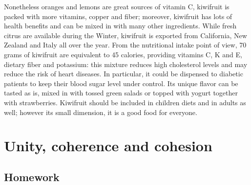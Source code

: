\documentclass[a4paper,dottedtoc,headinclude,footinclude]{report} %
\theoremstyle{plain}
\begin{document}
    Nonetheless oranges and lemons are great sources of vitamin C,
    kiwifruit is packed with more vitamins, copper and fiber;
    moreover, kiwifruit has lots of health benefits and can be mixed
    in with many other ingredients. While fresh citrus are available
    during the Winter, kiwifruit is exported from California, New
    Zealand and Italy all over the year. From the nutritional intake
    point of view, 70 grams of kiwifruit are equivalent to 45
    calories, providing vitamins C, K and E, dietary fiber and
    potassium: this mixture reduces high cholesterol levels and may
    reduce the risk of heart diseases. In particular, it could be
    dispensed to diabetic patients to keep their blood sugar level
    under control. Its unique flavor can be tasted as is, mixed in
    with tossed green salads or topped with yogurt together with
    strawberries.  Kiwifruit should be included in children diets and
    in adults as well; however its small dimension, it is a good food
    for everyone.
    
    \chapter{Unity, coherence and cohesion}
    
    \section{Homework}
\end{document}
